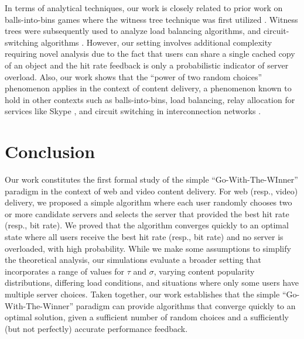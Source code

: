 \documentclass[conference]{IEEEtran}
\newcommand{\comment}[1]{}
\begin{document}
In terms of analytical techniques, our work is closely related to  prior work on balls-into-bins games where the witness tree technique was first utilized \cite{mitzenmacherRS2001}. Witness trees were subsequently used to analyze load balancing algorithms, and circuit-switching algorithms \cite{cole1998randomized}. However, our setting involves additional complexity requiring novel analysis due to the fact that users can share a single cached copy of an object and the hit rate feedback is only a probabilistic indicator of server overload. Also,  our work shows that the ``power of two random choices'' phenomenon  applies in the context of content delivery, a phenomenon known to hold in other contexts such as  balls-into-bins, load balancing, relay allocation for services like Skype \cite{Nguyen:2008}, and circuit switching in interconnection networks \cite{mitzenmacherRS2001}. 
\comment{
There are also parallels between our work on bit rate maximization for video delivery and the recent work on throughput maximization in multi-path communication \cite{Peter:2007}. Similar in spirit to our work, the work on multi-path communication concludes that coordinated rate control over multiple randomly selected paths provides optimal throughput and is significant better than uncoordinated control where rates are determined independently over each single path. However, our work also evolves techniques for determining the convergence rate that is potentially applicable in these domains.
 }
 
 \section{Conclusion}
 Our work constitutes the first formal study of the simple ``Go-With-The-WInner'' paradigm in the context of web and video content delivery.  For web (resp., video) delivery, we proposed a simple algorithm where each user randomly chooses two or more candidate servers and selects the server that provided the best hit rate (resp., bit rate). We proved that the algorithm converges quickly to an optimal state where all users receive the best hit rate (resp., bit rate) and no server is overloaded, with high probability.  While we make some assumptions to simplify the theoretical analysis, our simulations evaluate a broader setting that incorporates a range of values for $\tau$ and $\sigma$, varying  content popularity distributions, differing load conditions, and situations where only some users have multiple server choices. Taken together, our work establishes that the simple ``Go-With-The-Winner'' paradigm can provide algorithms that converge quickly to an optimal solution, given a sufficient number of random choices and a sufficiently (but not perfectly) accurate performance feedback.
 
\end{document}
